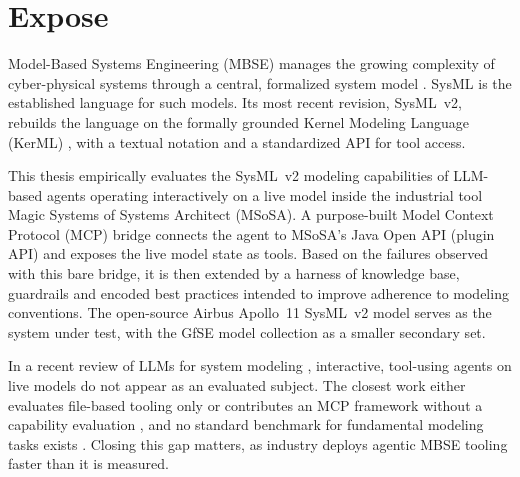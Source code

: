 \clearpage

\chapter{Expose}

%
%
Model-Based Systems Engineering (MBSE) manages the growing complexity of cyber-physical systems through a central, formalized system model \citep{incose2007mbsevision}. SysML is the established language for such models. Its most recent revision, SysML~v2, rebuilds the language on the formally grounded Kernel Modeling Language (KerML) \citep{omg-kerml}, with a textual notation and a standardized API for tool access.

%
%
This thesis empirically evaluates the SysML~v2 modeling capabilities of LLM-based agents operating interactively on a live model inside the industrial tool Magic Systems of Systems Architect (MSoSA). A purpose-built Model Context Protocol (MCP) bridge connects the agent to MSoSA's Java Open API (plugin API) and exposes the live model state as tools. Based on the failures observed with this bare bridge, it is then extended by a harness of knowledge base, guardrails and encoded best practices intended to improve adherence to modeling conventions. The open-source Airbus Apollo~11 SysML~v2 model \citep{helle2026apollo} serves as the system under test, with the GfSE model collection \citep{gfse-models} as a smaller secondary set.

%
%
In a recent review of LLMs for system modeling \citep{fresemann2025review}, interactive, tool-using agents on live models do not appear as an evaluated subject. The closest work either evaluates file-based tooling only \citep{dempsey2026nativeai} or contributes an MCP framework without a capability evaluation \citep{bazzal2026mcpmbse}, and no standard benchmark for fundamental modeling tasks exists \citep{bouamra2025systemp,quast2026graphrag}. Closing this gap matters, as industry deploys agentic MBSE tooling faster than it is measured.

